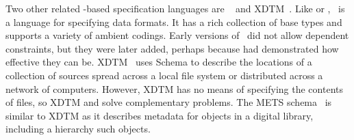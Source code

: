 Two other related \xml{}-based specification languages are
\dfdl~\cite{dfdl-proposal,dfdl-primer} and XDTM~\cite{xdtm,zhao+:sigmod05}.
Like \pads{} or \packettypes, \dfdl\ is a language for specifying data 
formats.  It has a rich collection of base types and supports a 
variety of ambient codings.  Early versions of \dfdl\ 
did not allow dependent constraints, but they were later added,
perhaps because \pads{} had demonstrated how effective they can be.
XDTM~\cite{xdtm,zhao+:sigmod05} uses \xml{} Schema to describe the
locations of a collection of sources spread across a local file system
or distributed across a network of computers.  However, XDTM has no
means of specifying the contents of files, so XDTM and \pads{} solve
complementary problems.  The METS schema~\cite{mets} is similar to XDTM as
it describes metadata for objects in a digital library, including a
hierarchy such objects.


